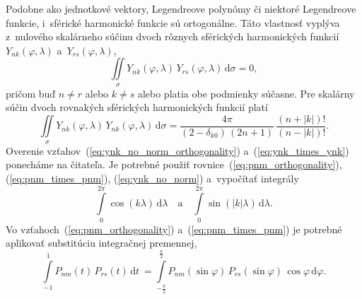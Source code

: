 \documentclass[a4paper, 12pt]{book}
\newcommand{\diff}{\mathrm d}
\begin{document}
Podobne ako jednotkové vektory, Legendreove polynómy či niektoré Legendreove
funkcie, i~sférické harmonické funkcie sú ortogonálne.  Táto vlastnosť vyplýva
z~nulového skalárneho súčinu dvoch rôznych sférických harmonických funkcií
$Y_{nk}(\varphi, \lambda)$ a~$Y_{rs}(\varphi, \lambda)$,
%
\begin{equation}
\label{eq:ynk_no_norm_orthogonality}
\iint\limits_{\sigma} Y_{nk}(\varphi, \lambda) \, Y_{rs}(\varphi, \lambda) \, 
\diff \sigma = 0{,}
\end{equation}
%
pričom buď $n \neq r$ alebo $k \neq s$ alebo platia obe podmienky súčasne.  Pre
skalárny súčin dvoch rovnakých sférických harmonických funkcií platí
%
\begin{equation}
\label{eq:ynk_times_ynk}
\iint\limits_{\sigma} Y_{nk}(\varphi, \lambda) \, Y_{nk}(\varphi, \lambda) \, 
\diff \sigma =
%
\dfrac{4\pi}{(2 - \delta_{k0}) \, (2n + 1)} \, \dfrac{(n + |k|)!}{(n
- |k|)!}{.}
\end{equation}
%
Overenie vzťahov~(\ref{eq:ynk_no_norm_orthogonality})
a~(\ref{eq:ynk_times_ynk}) ponecháme na čitateľa.  Je potrebné použiť
rovnice~(\ref{eq:pnm_orthogonality}), (\ref{eq:pnm_times_pnm}),
(\ref{eq:ynk_no_norm}) a~vypočítať integrály
%
\begin{equation}
\int\limits_{0}^{2\pi} \cos(k \lambda) \, \diff\lambda \quad \text{a} \quad
\int\limits_{0}^{2\pi} \sin(|k| \lambda) \, \diff\lambda{.}
\end{equation}
%
Vo vzťahoch~(\ref{eq:pnm_orthogonality}) a~(\ref{eq:pnm_times_pnm}) je potrebné
aplikovať substitúciu integračnej premennej,
%
\begin{equation}
\int\limits_{-1}^{1} P_{nm}(t) \, P_{rs}(t) \, \diff
t~= \int\limits_{-\frac{\pi}{2}}^{\frac{\pi}{2}} P_{nm}(\sin\varphi) \,
P_{rs}(\sin\varphi) \, \cos\varphi \, \diff \varphi{.}
\end{equation}
\end{document}
